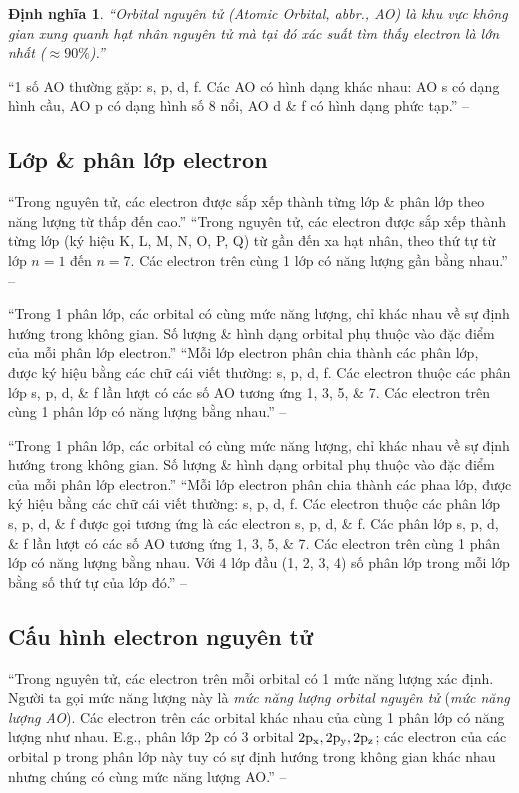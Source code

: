 \documentclass[oneside]{book}
\numberwithin{equation}{section}
\newtheorem{dinhnghia}{Định nghĩa}[section]
\begin{document}
\begin{dinhnghia}
	``\emph{Orbital nguyên tử} (\emph{Atomic Orbital}, abbr., \emph{AO}) là khu vực không gian xung quanh hạt nhân nguyên tử mà tại đó xác suất tìm thấy electron là lớn nhất ($\approx90\%$).''
\end{dinhnghia}
``1 số AO thường gặp: s, p, d, f. Các AO có hình dạng khác nhau: AO s có dạng hình cầu, AO p có dạng hình số 8 nổi, AO d \& f có hình dạng phức tạp.'' -- \cite[p. 28]{SGK_Hoa_Hoc_10_Chan_Troi_Sang_Tao}

\subsection{Lớp \& phân lớp electron}
``Trong nguyên tử, các electron được sắp xếp thành từng lớp \& phân lớp theo năng lượng từ thấp đến cao.'' ``Trong nguyên tử, các electron được sắp xếp thành từng lớp (ký hiệu K, L, M, N, O, P, Q) từ gần đến xa hạt nhân, theo thứ tự từ lớp $n = 1$ đến $n = 7$. Các electron trên cùng 1 lớp có năng lượng gần bằng nhau.'' -- \cite[p. 28]{SGK_Hoa_Hoc_10_Chan_Troi_Sang_Tao}

``Trong 1 phân lớp, các orbital có cùng mức năng lượng, chỉ khác nhau về sự định hướng trong không gian. Số lượng \& hình dạng orbital phụ thuộc vào đặc điểm của mỗi phân lớp electron.'' ``Mỗi lớp electron phân chia thành các phân lớp, được ký hiệu bằng các chữ cái viết thường: s, p, d, f. Các electron thuộc các phân lớp s, p, d, \& f lần lượt có các số AO tương ứng 1, 3, 5, \& 7. Các electron trên cùng 1 phân lớp có năng lượng bằng nhau.'' -- \cite[p. 28]{SGK_Hoa_Hoc_10_Chan_Troi_Sang_Tao}

``Trong 1 phân lớp, các orbital có cùng mức năng lượng, chỉ khác nhau về sự định hướng trong không gian. Số lượng \& hình dạng orbital phụ thuộc vào đặc điểm của mỗi phân lớp electron.'' ``Mỗi lớp electron phân chia thành các phaa lớp, được ký hiệu bằng các chữ cái viết thường: s, p, d, f. Các electron thuộc các phân lớp s, p, d, \& f được gọi tương ứng là các electron s, p, d, \& f. Các phân lớp s, p, d, \& f lần lượt có các số AO tương ứng 1, 3, 5, \& 7. Các electron trên cùng 1 phân lớp có năng lượng bằng nhau. Với 4 lớp đầu (1, 2, 3, 4) số phân lớp trong mỗi lớp bằng số thứ tự của lớp đó.'' -- \cite[p. 28]{SGK_Hoa_Hoc_10_Chan_Troi_Sang_Tao}

\subsection{Cấu hình electron nguyên tử}
``Trong nguyên tử, các electron trên mỗi orbital có 1 mức năng lượng xác định. Người ta gọi mức năng lượng này là \textit{mức năng lượng orbital nguyên tử} (\textit{mức năng lượng AO}). Các electron trên các orbital khác nhau của cùng 1 phân lớp có năng lượng như nhau. E.g., phân lớp 2p có 3 orbital $\rm 2p_x,2p_y,2p_z$; các electron của các orbital p trong phân lớp này tuy có sự định hướng trong không gian khác nhau nhưng chúng có cùng mức năng lượng AO.'' -- \cite[p. 29]{SGK_Hoa_Hoc_10_Chan_Troi_Sang_Tao}
\end{document}
